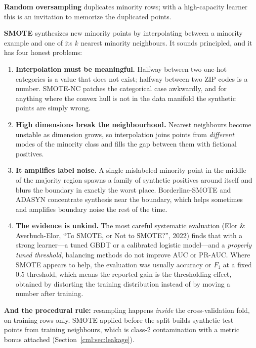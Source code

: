 \textbf{Random oversampling} duplicates minority rows; with a high-capacity learner this is an invitation to memorize the duplicated points.

\textbf{SMOTE} synthesizes new minority points by interpolating between a minority example and one of its $k$ nearest minority neighbours. It sounds principled, and it has four honest problems:
\begin{enumerate}
    \item \textbf{Interpolation must be meaningful.} Halfway between two one-hot categories is a value that does not exist; halfway between two ZIP codes is a number. SMOTE-NC patches the categorical case awkwardly, and for anything where the convex hull is not in the data manifold the synthetic points are simply wrong.
    \item \textbf{High dimensions break the neighbourhood.} Nearest neighbours become unstable as dimension grows, so interpolation joins points from \emph{different} modes of the minority class and fills the gap between them with fictional positives.
    \item \textbf{It amplifies label noise.} A single mislabeled minority point in the middle of the majority region spawns a family of synthetic positives around itself and blurs the boundary in exactly the worst place. Borderline-SMOTE and ADASYN concentrate synthesis near the boundary, which helps sometimes and amplifies boundary noise the rest of the time.
    \item \textbf{The evidence is unkind.} The most careful systematic evaluation (Elor \& Averbuch-Elor, ``To SMOTE, or Not to SMOTE?'', 2022) finds that with a strong learner---a tuned GBDT or a calibrated logistic model---and a \emph{properly tuned threshold}, balancing methods do not improve AUC or PR-AUC. Where SMOTE appears to help, the evaluation was usually accuracy or $F_1$ at a fixed 0.5 threshold, which means the reported gain is the thresholding effect, obtained by distorting the training distribution instead of by moving a number after training.
\end{enumerate}

\textbf{And the procedural rule:} resampling happens \emph{inside} the cross-validation fold, on training rows only. SMOTE applied before the split builds synthetic test points from training neighbours, which is class-2 contamination with a metric bonus attached (Section~\ref{cml:sec:leakage}).

